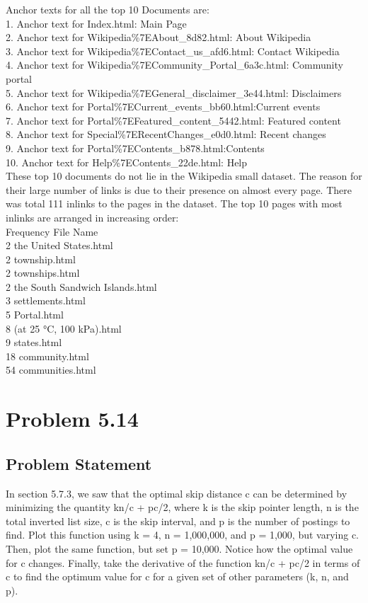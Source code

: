 \documentclass[12pt]{report}
\begin{document}
Anchor texts for all the top 10 Documents are:\\

1. Anchor text for Index.html: Main Page\\
2. Anchor text for Wikipedia\%7EAbout\_8d82.html: About Wikipedia\\ 
3. Anchor text for Wikipedia\%7EContact\_us\_afd6.html: Contact Wikipedia\\
4. Anchor text for Wikipedia\%7ECommunity\_Portal\_6a3c.html: Community portal\\
5. Anchor text for Wikipedia\%7EGeneral\_disclaimer\_3e44.html: Disclaimers\\
6. Anchor text for Portal\%7ECurrent\_events\_bb60.html:Current events\\
7. Anchor text for Portal\%7EFeatured\_content\_5442.html: Featured content\\
8. Anchor text for Special\%7ERecentChanges\_e0d0.html: Recent changes\\
9. Anchor text for Portal\%7EContents\_b878.html:Contents\\
10. Anchor text for Help\%7EContents\_22de.html: Help\\

These top 10 documents do not lie in the Wikipedia small dataset. The reason for their large number of links is due to their presence on almost every page. There was total 111 inlinks to the pages in the dataset. The top 10 pages with most inlinks are arranged in increasing order:\\
    Frequency File Name\\
      2 the United States.html\\
      2 township.html\\
      2 townships.html\\
      2 the South Sandwich Islands.html\\
      3 settlements.html\\
      5 Portal.html\\
      8 (at 25 °C, 100 kPa).html\\
      9 states.html\\
     18 community.html\\
     54 communities.html\\

\chapter{Problem 5.14}
\section{Problem Statement}
In section 5.7.3, we saw that the optimal skip distance c can be determined by minimizing the quantity kn/c + pc/2, where k is the skip pointer length, n is the total inverted list size, c is the skip interval, and p is the number of postings to find. Plot this function using k = 4, n = 1,000,000, and p = 1,000, but varying c. Then, plot the same function, but set p = 10,000. Notice how the optimal value for c changes. Finally, take the derivative of the function kn/c + pc/2 in terms of c to find the optimum value for c for a given set of other parameters (k, n, and p).
\end{document}
